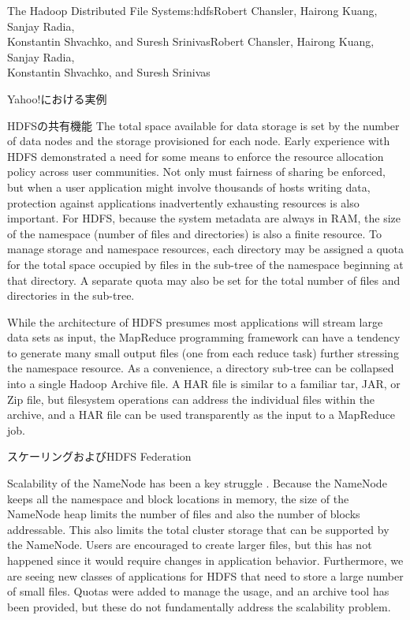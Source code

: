 \begin{aosachaptertoc}{The Hadoop Distributed File System}{s:hdfs}{Robert Chansler, Hairong Kuang, Sanjay Radia, \\ Konstantin Shvachko, and Suresh Srinivas}{Robert Chansler, Hairong Kuang, Sanjay Radia, \\ \hspace*{0.9cm} Konstantin Shvachko, and Suresh Srinivas}
\begin{aosasect1}{Yahoo!における実例}
\begin{aosasect2}{HDFSの共有機能}
The total space available for data storage is set by the number of
data nodes and the storage provisioned for each node. Early experience
with HDFS demonstrated a need for some means to enforce the resource
allocation policy across user communities. Not only must fairness of
sharing be enforced, but when a user application might involve
thousands of hosts writing data, protection against applications
inadvertently exhausting resources is also important. For HDFS,
because the system metadata are always in RAM, the size of the
namespace (number of files and directories) is also a finite
resource. To manage storage and namespace resources, each directory
may be assigned a quota for the total space occupied by files in the
sub-tree of the namespace beginning at that directory. A separate
quota may also be set for the total number of files and directories in
the sub-tree.

While the architecture of HDFS presumes most applications will stream
large data sets as input, the MapReduce programming framework can have
a tendency to generate many small output files (one from each reduce
task) further stressing the namespace resource. As a convenience, a
directory sub-tree can be collapsed into a single Hadoop Archive
file. A HAR file is similar to a familiar tar, JAR, or Zip file, but
filesystem operations can address the individual files within the
archive, and a HAR file can be used transparently as the input to a
MapReduce job.

\end{aosasect2}

\begin{aosasect2}{スケーリングおよびHDFS Federation}

Scalability of the NameNode has been a key struggle
\cite{bib:shvachko:hdfs}.  Because the NameNode keeps all the
namespace and block locations in memory, the size of the NameNode heap
limits the number of files and also the number of blocks
addressable. This also limits the total cluster storage that can be
supported by the NameNode. Users are encouraged to create larger
files, but this has not happened since it would require changes in
application behavior. Furthermore, we are seeing new classes of
applications for HDFS that need to store a large number of small
files. Quotas were added to manage the usage, and an archive tool has
been provided, but these do not fundamentally address the
scalability problem.


\end{aosasect2}
\end{aosasect1}
\end{aosachaptertoc}
